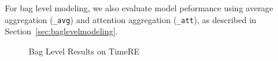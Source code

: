 For bag level modeling, we also evaluate model peformance using average aggregation (\texttt{\_avg})
and attention aggregation (\texttt{\_att}), as described in Section~\ref{sec:baglevelmodeling}.

\begin{figure}[htbp]
\centering
{}
\caption{Bag Level Results on TimeRE}
\label{fig: results_on_luo}
\end{figure}

